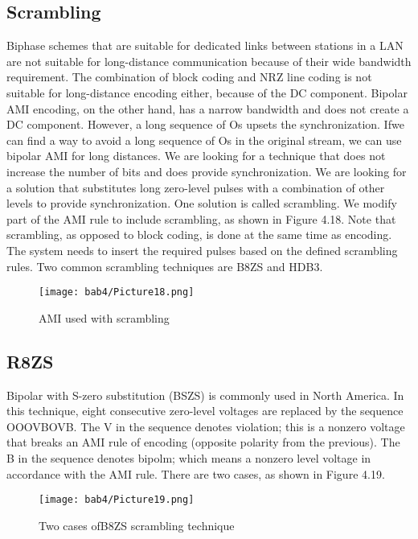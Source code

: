 \subsection{Scrambling}
Biphase schemes that are suitable for dedicated links between stations in a LAN are not suitable for long-distance communication because of their wide bandwidth requirement. The combination of block coding and NRZ line coding is not suitable for long-distance encoding either, because of the DC component. Bipolar AMI encoding, on the other hand, has a narrow bandwidth and does not create a DC component. However, a long sequence of Os upsets the synchronization. Ifwe can find a way to avoid a long sequence of Os in the original stream, we can use bipolar AMI for long distances. We are looking for a technique that does not increase the number of bits and does provide synchronization. We are looking for a solution that substitutes long zero-level pulses with a combination of other levels to provide synchronization. One solution is called scrambling. We modify part of the AMI rule to include scrambling, as shown in Figure 4.18. Note that scrambling, as opposed to block coding, is done at the same time as encoding. The system needs to insert the required pulses based on the defined scrambling rules. Two common scrambling techniques are B8ZS and HDB3.

\begin{figure}
  \centering
  \texttt{[image: bab4/Picture18.png]}
  \caption{AMI used with scrambling}
  \label{fig4:18}
\end{figure}

\subsection*{R8ZS}
Bipolar with S-zero substitution (BSZS) is commonly used in North America. In this technique, eight consecutive zero-level voltages are replaced by the sequence OOOVBOVB. The V in the sequence denotes violation; this is a nonzero voltage that breaks an AMI rule of encoding (opposite polarity from the previous). The B in the sequence denotes bipolm; which means a nonzero level voltage in accordance with the AMI rule. There are two cases, as shown in Figure 4.19.

\begin{figure}
  \centering
  \texttt{[image: bab4/Picture19.png]}
  \caption{Two cases ofB8ZS scrambling technique}
  \label{fig4:19}
\end{figure}

